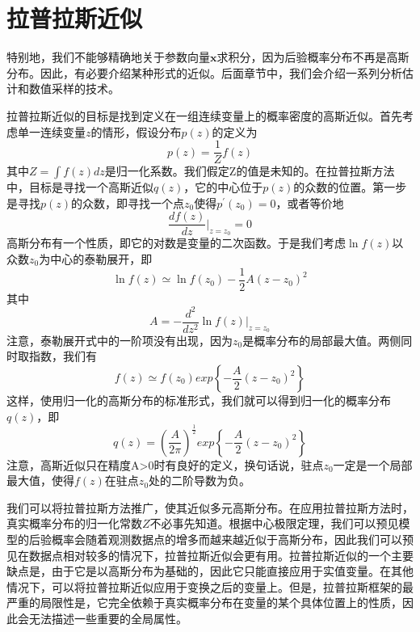 \section{拉普拉斯近似}
特别地，我们不能够精确地关于参数向量$\boldsymbol{x}$求积分，因为后验概率分布不再是高斯分布。因此，有必要介绍某种形式的近似。后面章节中，我们会介绍一系列分析估计和数值采样的技术。

拉普拉斯近似的目标是找到定义在一组连续变量上的概率密度的高斯近似。首先考虑单一连续变量$z$的情形，假设分布$p(z)$的定义为
\begin{equation}
	p(z)=\frac{1}{Z}f(z)
\end{equation}
其中$Z=\int f(z)dz$是归一化系数。我们假定Z的值是未知的。在拉普拉斯方法中，目标是寻找一个高斯近似$q(z)$，它的中心位于$p(z)$的众数的位置。第一步是寻找$p(z)$的众数，即寻找一个点$z_0$使得$p^{'}(z_0)=0$，或者等价地
\begin{equation}
	\frac{df(z)}{dz}\Bigg|_{z=z_0}=0
\end{equation}
高斯分布有一个性质，即它的对数是变量的二次函数。于是我们考虑$\ln f(z)$以众数$z_0$为中心的泰勒展开，即
\begin{equation}
	\ln f(z)\simeq \ln f(z_0) -\frac{1}{2}A(z-z_0)^2
\end{equation}
其中
\begin{equation}
	A=-\frac{d^2}{dz^2}\ln f(z)\Bigg|_{z=z_0}
\end{equation}
注意，泰勒展开式中的一阶项没有出现，因为$z_0$是概率分布的局部最大值。两侧同时取指数，我们有
\begin{equation}
	f(z)\simeq f(z_0)exp\left\{-\frac{A}{2}(z-z_0)^2 \right\}
\end{equation}
这样，使用归一化的高斯分布的标准形式，我们就可以得到归一化的概率分布$q(z)$，即
\begin{equation}
	q(z)=\left(\frac{A}{2\pi} \right)^{\frac{1}{2}}exp\left\{-\frac{A}{2}(z-z_0)^2 \right\}
\end{equation}
注意，高斯近似只在精度A>0时有良好的定义，换句话说，驻点$z_0$一定是一个局部最大值，使得$f(z)$在驻点$z_0$处的二阶导数为负。

我们可以将拉普拉斯方法推广，使其近似多元高斯分布。在应用拉普拉斯方法时，真实概率分布的归一化常数$Z$不必事先知道。根据中心极限定理，我们可以预见模型的后验概率会随着观测数据点的增多而越来越近似于高斯分布，因此我们可以预见在数据点相对较多的情况下，拉普拉斯近似会更有用。拉普拉斯近似的一个主要缺点是，由于它是以高斯分布为基础的，因此它只能直接应用于实值变量。在其他情况下，可以将拉普拉斯近似应用于变换之后的变量上。但是，拉普拉斯框架的最严重的局限性是，它完全依赖于真实概率分布在变量的某个具体位置上的性质，因此会无法描述一些重要的全局属性。
